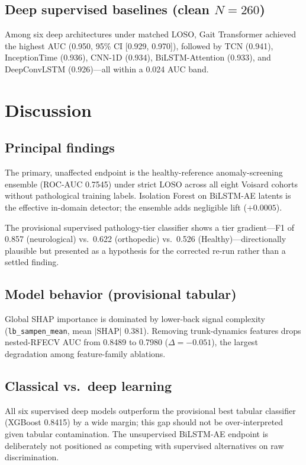\documentclass[11pt,a4paper]{article}
\begin{document}
\subsection{Deep supervised baselines (clean $N=260$)}

Among six deep architectures under matched LOSO, Gait Transformer achieved the highest AUC (0.950, 95\% CI [0.929, 0.970]), followed by TCN (0.941), InceptionTime (0.936), CNN-1D (0.934), BiLSTM-Attention (0.933), and DeepConvLSTM (0.926)---all within a 0.024 AUC band.

\section{Discussion}

\subsection{Principal findings}

The primary, unaffected endpoint is the healthy-reference anomaly-screening ensemble (ROC-AUC 0.7545) under strict LOSO across all eight Voisard cohorts without pathological training labels. Isolation Forest on BiLSTM-AE latents is the effective in-domain detector; the ensemble adds negligible lift ($+0.0005$).

The provisional supervised pathology-tier classifier shows a tier gradient---F1 of 0.857 (neurological) vs.\ 0.622 (orthopedic) vs.\ 0.526 (Healthy)---directionally plausible but presented as a hypothesis for the corrected re-run rather than a settled finding.

\subsection{Model behavior (provisional tabular)}

Global SHAP importance is dominated by lower-back signal complexity (\texttt{lb\_sampen\_mean}, mean $|$SHAP$|$ 0.381). Removing trunk-dynamics features drops nested-RFECV AUC from 0.8489 to 0.7980 ($\Delta=-0.051$), the largest degradation among feature-family ablations.

\subsection{Classical vs.\ deep learning}

All six supervised deep models outperform the provisional best tabular classifier (XGBoost 0.8415) by a wide margin; this gap should not be over-interpreted given tabular contamination. The unsupervised BiLSTM-AE endpoint is deliberately not positioned as competing with supervised alternatives on raw discrimination.
\end{document}
